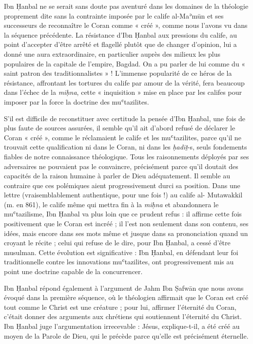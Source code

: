 Ibn Ḥanbal ne se serait sans doute pas aventuré dans les domaines de la
théologie proprement dite sans la contrainte imposée par le calife
al-Maʾmūn et ses successeurs de reconnaître le Coran comme « créé »,
comme nous l'avons vu dans la séquence précédente. La résistance d'Ibn
Ḥanbal aux pressions du calife, au point d'accepter d'être arrêté et
flagellé plutôt que de changer d'opinion, lui a donné une aura
extraordinaire, en particulier auprès des milieux les plus populaires de
la capitale de l'empire, Bagdad. On a pu parler de lui comme du « saint
patron des traditionnalistes » ! L'immense popularité de ce héros de la
résistance, affrontant les tortures du calife par amour de la vérité,
fera beaucoup dans l'échec de la \emph{miḥna}, cette « inquisition »
mise en place par les califes pour imposer par la force la doctrine des
muʿtazilites.

S'il est difficile de reconstituer avec certitude la pensée d'Ibn
Ḥanbal, une fois de plus faute de sources assurées, il semble qu'il ait
d'abord refusé de déclarer le Coran « créé », comme le réclamaient le
calife et les muʿtazilites, parce qu'il ne trouvait cette qualification
ni dans le Coran, ni dans les \emph{ḥadīṯ}-s, seuls fondements fiables
de notre connaissance théologique. Tous les raisonnements déployés par
ses adversaires ne pouvaient pas le convaincre, précisément parce qu'il
doutait des capacités de la raison humaine à parler de Dieu
adéquatement. Il semble au contraire que ces polémiques aient
progressivement durci
sa position. Dans une lettre (vraisemblablement authentique, pour une
fois !) au calife al- Mutawakkil (m. en 861), le calife même qui mettra
fin à la \emph{miḥna} et abandonnera le muʿtazilisme, Ibn Ḥanbal va plus
loin que ce prudent refus : il affirme cette fois positivement que le
Coran est incréé ; il l'est non seulement dans son contenu, ses idées,
mais encore dans ses mots même et jusque dans sa prononciation quand un
croyant le récite ; celui qui refuse de le dire, pour Ibn Ḥanbal, a
cessé d'être musulman. Cette évolution est significative : Ibn Ḥanbal,
en défendant leur foi traditionnelle contre les innovations
muʿtazilites, ont progressivement mis au point une doctrine capable de
la concurrencer.

Ibn Ḥanbal répond également à l'argument de Jahm Ibn Ṣafwān que nous
avons évoqué dans la première séquence, où le théologien affirmait que
le Coran est créé tout comme le Christ est une créature ; pour lui,
affirmer l'éternité du Coran, c'était donner des arguments aux chrétiens
qui soutiennent l'éternité du Christ. Ibn Ḥanbal juge l'argumentation
irrecevable : Jésus, explique-t-il, a été créé au moyen de la Parole de
Dieu, qui le précède parce qu'elle est précisément éternelle.


